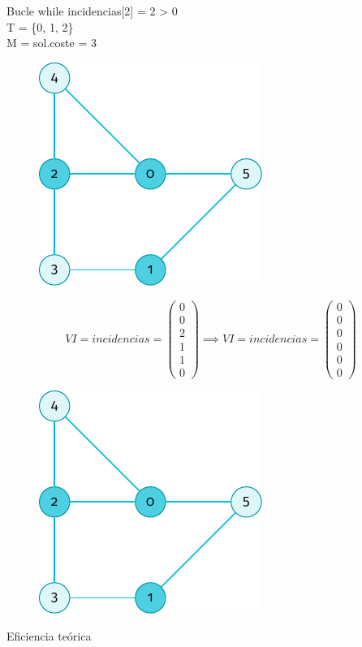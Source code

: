 \documentclass[spanish]{beamer}
\begin{document}
\begin{frame}{Bucle while}
	incidencias[2] = 2 > 0\\
	T = \{0, 1, 2\}\\
	M = sol.coste = 3
	\begin{figure}[H]
		\centering \includegraphics{./img/grafo-ejemplo.pdf}
	\end{figure}
\end{frame}

\begin{frame}{}
	$$  VI = incidencias = 
	\begin{pmatrix}
	  0 \\
	  0 \\
	  2 \\
	  1 \\
	  1 \\
	  0
	\end{pmatrix} \implies  VI = incidencias = 
	\begin{pmatrix}	
	  0 \\
	  0 \\
	  0 \\
	  0 \\
	  0 \\
	  0
	\end{pmatrix}$$
	\begin{figure}[H]
		\centering \includegraphics{./img/grafo-ejemplo.pdf}
	\end{figure}
\end{frame}

\begin{frame}{Eficiencia teórica}
    \fontsize{8pt}{7.2}\selectfont
	\begin{center}
	\resizebox*{11cm}{!}{
	}
	\end{center}    
\end{frame}
\end{document}
